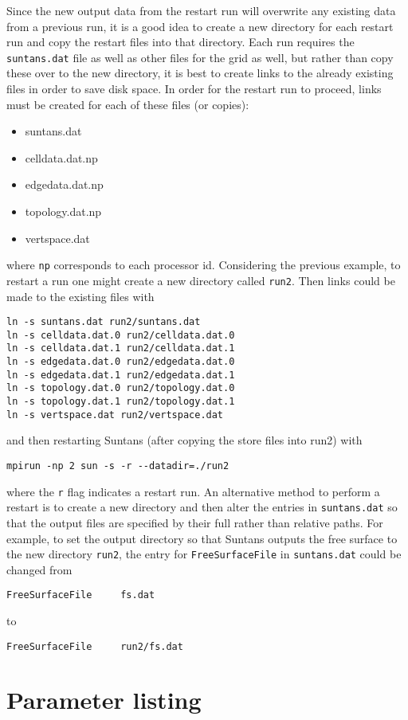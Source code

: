 \documentclass[12pt,oneside]{article}
\begin{document}
Since the new output data from the restart run will overwrite any existing data from a previous run, it is
a good idea to create a new directory for each restart run and copy the restart files into that directory.
Each run requires the \verb+suntans.dat+ file as well as other files for the grid as well, but rather than
copy these over to the new directory, it is best to create links to the already existing files in order
to save disk space.  In order for the restart run to proceed, links must be created for each of these
files (or copies):
\begin{itemize}
\item suntans.dat
\item celldata.dat.np
\item edgedata.dat.np
\item topology.dat.np
\item vertspace.dat
\end{itemize}
where \verb+np+ corresponds to each processor id.  Considering the previous example, to restart a run
one might create a new directory called \verb+run2+.  Then links could be made to the existing files 
with
\begin{verbatim}
ln -s suntans.dat run2/suntans.dat
ln -s celldata.dat.0 run2/celldata.dat.0
ln -s celldata.dat.1 run2/celldata.dat.1
ln -s edgedata.dat.0 run2/edgedata.dat.0
ln -s edgedata.dat.1 run2/edgedata.dat.1
ln -s topology.dat.0 run2/topology.dat.0
ln -s topology.dat.1 run2/topology.dat.1
ln -s vertspace.dat run2/vertspace.dat
\end{verbatim}
and then restarting Suntans (after copying the store files into run2) with
\begin{verbatim}
mpirun -np 2 sun -s -r --datadir=./run2
\end{verbatim}
where the \verb+r+ flag indicates a restart run.  An alternative method to perform a restart
is to create a new directory and then alter the entries in \verb+suntans.dat+ so that the
output files are specified by their full rather than relative paths.  For example, to set
the output directory so that Suntans outputs the free surface to the new directory \verb+run2+,
the entry for \verb+FreeSurfaceFile+ in \verb+suntans.dat+ could be changed from
\begin{verbatim}
FreeSurfaceFile   	fs.dat
\end{verbatim}
to
\begin{verbatim}
FreeSurfaceFile   	run2/fs.dat
\end{verbatim}

\appendix

\section{Parameter listing} \label{app:params}



\end{document}
